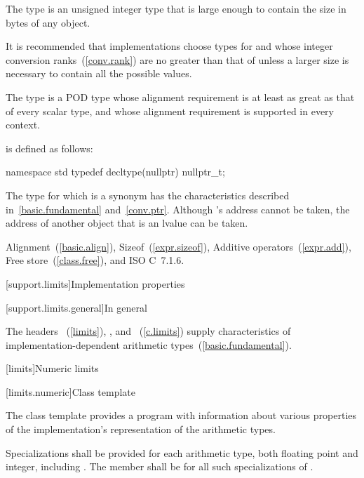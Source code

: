 \pnum
The type  is an
unsigned integer type that is large enough
to contain the size in bytes of any object.

\pnum
\enternote
It is recommended that implementations choose types for  and 
whose integer conversion ranks~(\ref{conv.rank}) are no greater than that of
 unless a larger size is necessary to contain all the possible values.
\exitnote

\pnum
The type
%
 is a POD type whose alignment requirement
is at least as great as that of every scalar type, and whose alignment
requirement is supported in every context.

\pnum
{}%
 is defined as follows:

\begin{codeblock}
namespace std {
  typedef decltype(nullptr) nullptr_t;
}
\end{codeblock}

The type for which  is a synonym has the characteristics
described in~\ref{basic.fundamental} and~\ref{conv.ptr}. \enternote Although
's address cannot be taken, the address of another
 object that is an lvalue can be taken. \exitnote

\xref Alignment~(\ref{basic.align}), Sizeof~(\ref{expr.sizeof}), Additive
operators~(\ref{expr.add}), Free store~(\ref{class.free}), and ISO C~7.1.6.

[support.limits]{Implementation properties}

[support.limits.general]{In general}

\pnum
The headers
~(\ref{limits}),
, and
~(\ref{c.limits})
supply characteristics of implementation-dependent
arithmetic types~(\ref{basic.fundamental}).

[limits]{Numeric limits}

[limits.numeric]{Class template }

\pnum
The
%
class template provides a \Cpp program with information about various properties of
the implementation's representation of the
arithmetic types.

\pnum
Specializations shall be provided for each
arithmetic type,
both floating point and integer, including
.
The member
shall be
for all such specializations of
.

